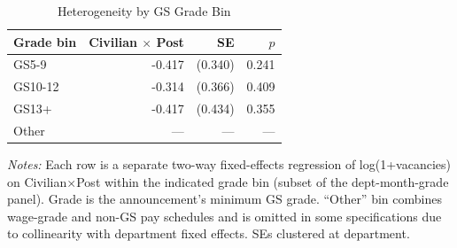 \begin{table}[!ht]
\centering
\caption{Heterogeneity by GS Grade Bin}
\label{tab:grade}
\small
\begin{tabular}{lrrr}
\toprule
Grade bin & Civilian $\times$ Post & SE & $p$ \\
\midrule
GS5-9 & -0.417 & (0.340) & 0.241 \\
GS10-12 & -0.314 & (0.366) & 0.409 \\
GS13+ & -0.417 & (0.434) & 0.355 \\
Other & --- & --- & --- \\
\bottomrule
\end{tabular}
\begin{minipage}{0.92\textwidth}
\footnotesize\textit{Notes:} Each row is a separate two-way fixed-effects regression of log(1+vacancies) on Civilian$\times$Post within the indicated grade bin (subset of the dept-month-grade panel). Grade is the announcement's minimum GS grade. ``Other'' bin combines wage-grade and non-GS pay schedules and is omitted in some specifications due to collinearity with department fixed effects. SEs clustered at department.
\end{minipage}
\end{table}
